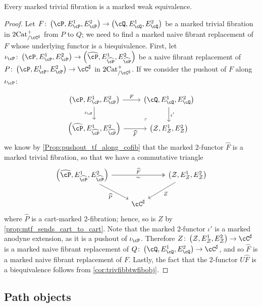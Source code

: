 \documentclass[11pt, dvipsnames]{amsart}
\begin{document}
	\begin{prop}
	\label{prop:trivial_fibration_is_w}
	Every marked trivial fibration is a marked weak equivalence.
	\end{prop}
	\begin{proof}
	Let $F\colon \markedscat{\cP} \to \markedscat{\cQ}$ be a  marked trivial fibration in $\twocat^{+}_{{/\Csharp}}$ from $P$ to $Q$; we need to find a marked naive fibrant replacement of $F$ whose underlying functor is a biequivalence. First, let $\iota_{\cP}\colon\markedscat{\cP}\to \markedscat{\widehat{\cP}}$ be a naive fibrant replacement of  $P\colon\markedscat{\cP}\to \cC^{\sharp}$ in $\twocat^{+}_{/\Csharp}$. If we consider the pushout of $F$ along $\iota_{\cP}$: 

	\[\begin{tikzcd}
		{\markedscat{\cP}} & {\markedscat{\cQ}} \\
		{\markedscat{\widehat{\cP}}} & {\markedscat{\mathcal{Z}}}
		\arrow["F", from=1-1, to=1-2]
		\arrow["\iota_{\cP}"', from=1-1, to=2-1]
		\arrow["{\iota'}", from=1-2, to=2-2]
		\arrow["{\widehat{F}}"', from=2-1, to=2-2]
		\arrow["\lrcorner"{anchor=center, pos=0.125, rotate=180}, draw=none, from=2-2, to=1-1]
	\end{tikzcd}\]
	we know by \cref{Prop:pushout_tf_along_cofib} that the marked 2-functor $\widehat{F}$ is a marked trivial fibration, so that we have a commutative triangle 
	\[\begin{tikzcd}
		{\markedscat{\widehat{\cP}}} && {\markedscat{\mathcal{Z}}} \\
		& {\cC^{\sharp}}
		\arrow["{\widehat{F}}","\sim"', from=1-1, to=1-3, twoheadrightarrow]
		\arrow[from=1-1, to=2-2,"\widehat{P}"']
		\arrow[from=1-3, to=2-2,"Z"]
	\end{tikzcd}\]
	where $\widehat{P}$ is a cart-marked 2-fibration; hence, so is $Z$ by \cref{prop:mtf_sends_cart_to_cart}. Note that the marked 2-functor $\iota'$ is a marked anodyne extension, as it is a pushout of $\iota_\cP$. Therefore $Z\colon\markedscat{\mathcal{Z}}\to\cC^\sharp$ is a marked naive fibrant replacement of $Q\colon\markedscat{\cQ}\to\Csharp$, and so $\widehat{F}$ is a marked naive fibrant replacement of $F$. Lastly, the fact that the 2-functor $U\widehat{F}$ is a biequivalence follows from \cref{cor:trivfibbtwfibobj}. 
	\end{proof}


    \subsection{Path objects}\label{sec:pathobject}
\end{document}
